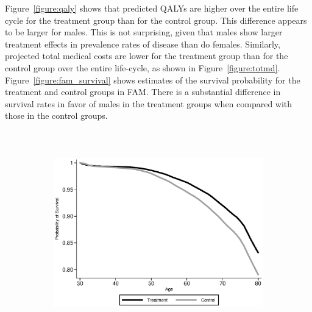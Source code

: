 \noindent Figure~\ref{figure:qaly} shows that predicted QALYs are higher over the entire life cycle for the treatment group than for the control group. This difference appears to be larger for males. This is not surprising, given that males show larger treatment effects in prevalence rates of disease than do females. Similarly, projected total medical costs are lower for the treatment group than for the control group over the entire life-cycle, as shown in Figure~\ref{figure:totmd}.
Figure~\ref{figure:fam_survival} shows estimates of the survival probability for the treatment and control groups in FAM. There is a substantial difference in survival rates in favor of males in the treatment groups when compared with those in the control groups. \\


\begin{figure}[H]
    \centering
\caption{Predicted Survival} \label{figure:fam_survival}
\begin{subfigure}{.8\textwidth}
  \centering
  \includegraphics[height=3.5in]{AppOutput/Health/ABC-FAM_survival_male}
\end{subfigure}


\end{figure}
